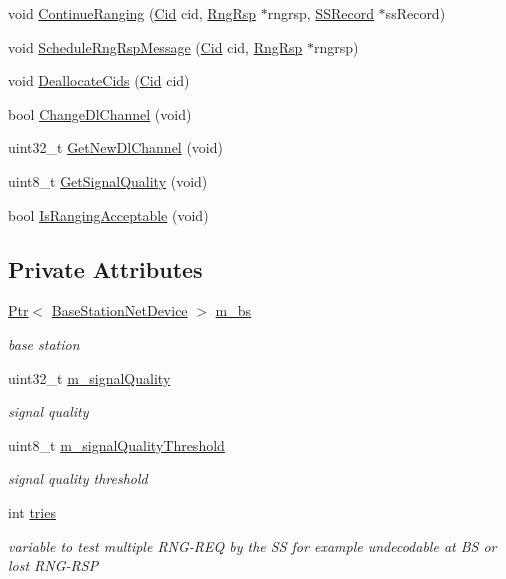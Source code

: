 \begin{DoxyCompactItemize}
void \hyperlink{classns3_1_1BSLinkManager_abb7f2a1602887788e0a8d9346a76fd9c}{Continue\+Ranging} (\hyperlink{classns3_1_1Cid}{Cid} cid, \hyperlink{classns3_1_1RngRsp}{Rng\+Rsp} $\ast$rngrsp, \hyperlink{classns3_1_1SSRecord}{S\+S\+Record} $\ast$ss\+Record)
\item 
void \hyperlink{classns3_1_1BSLinkManager_a80ee98e2b166372c03c840b8904e062a}{Schedule\+Rng\+Rsp\+Message} (\hyperlink{classns3_1_1Cid}{Cid} cid, \hyperlink{classns3_1_1RngRsp}{Rng\+Rsp} $\ast$rngrsp)
\item 
void \hyperlink{classns3_1_1BSLinkManager_a6b53e97ec1e97279dae830a5f8abbaaa}{Deallocate\+Cids} (\hyperlink{classns3_1_1Cid}{Cid} cid)
\item 
bool \hyperlink{classns3_1_1BSLinkManager_af433428804a92b8e82256ccaf99c34fc}{Change\+Dl\+Channel} (void)
\item 
uint32\+\_\+t \hyperlink{classns3_1_1BSLinkManager_a7f2cb235a8f2849921f3460b4ab0ac7b}{Get\+New\+Dl\+Channel} (void)
\item 
uint8\+\_\+t \hyperlink{classns3_1_1BSLinkManager_a5ec556b1346b2147c54c07abfca3913c}{Get\+Signal\+Quality} (void)
\item 
bool \hyperlink{classns3_1_1BSLinkManager_af62c80bd793222cb430a34ef9ec022d8}{Is\+Ranging\+Acceptable} (void)
\end{DoxyCompactItemize}
\subsection*{Private Attributes}
\begin{DoxyCompactItemize}
\item 
\hyperlink{classns3_1_1Ptr}{Ptr}$<$ \hyperlink{classns3_1_1BaseStationNetDevice}{Base\+Station\+Net\+Device} $>$ \hyperlink{classns3_1_1BSLinkManager_a03e8b376dd28651abfeded291ea52fc8}{m\+\_\+bs}
\begin{DoxyCompactList}\small\item\em base station \end{DoxyCompactList}\item 
uint32\+\_\+t \hyperlink{classns3_1_1BSLinkManager_afcbe9d8fc962a6a39f0c99adcf9b985c}{m\+\_\+signal\+Quality}
\begin{DoxyCompactList}\small\item\em signal quality \end{DoxyCompactList}\item 
uint8\+\_\+t \hyperlink{classns3_1_1BSLinkManager_a7f6d2a2b929aa3075d766569c40ce51b}{m\+\_\+signal\+Quality\+Threshold}
\begin{DoxyCompactList}\small\item\em signal quality threshold \end{DoxyCompactList}\item 
int \hyperlink{classns3_1_1BSLinkManager_a7eeaf72c73cddf69a0a5cb90ab1c1fc1}{tries}
\begin{DoxyCompactList}\small\item\em variable to test multiple R\+N\+G-\/\+R\+EQ by the SS for example undecodable at BS or lost R\+N\+G-\/\+R\+SP \end{DoxyCompactList}\end{DoxyCompactItemize}
